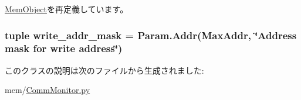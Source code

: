 \hyperlink{classMemObject_1_1MemObject_acce15679d830831b0bbe8ebc2a60b2ca}{MemObject}を再定義しています。\hypertarget{classCommMonitor_1_1CommMonitor_a802ec9e3dd95bdcd492a181db99481d8}{
\subsubsection[{write\_\-addr\_\-mask}]{\setlength{\rightskip}{0pt plus 5cm}tuple {\bf write\_\-addr\_\-mask} = {\bf Param.Addr}({\bf MaxAddr}, \char`\"{}Address mask for write address\char`\"{})}}
\label{classCommMonitor_1_1CommMonitor_a802ec9e3dd95bdcd492a181db99481d8}


このクラスの説明は次のファイルから生成されました:\begin{DoxyCompactItemize}
\item 
mem/\hyperlink{CommMonitor_8py}{CommMonitor.py}\end{DoxyCompactItemize}
